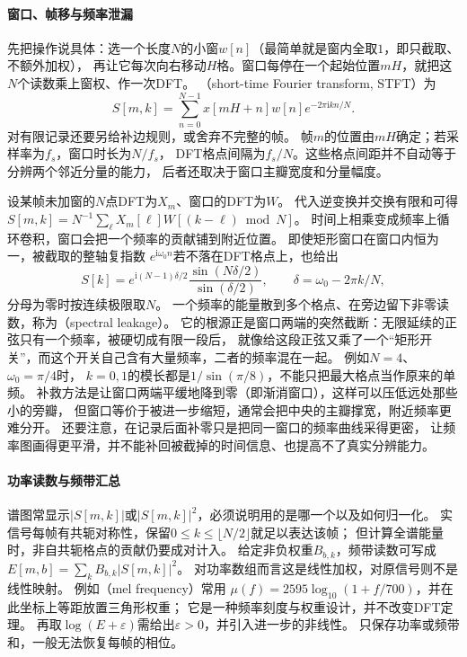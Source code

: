 \paragraph{窗口、帧移与频率泄漏}
先把操作说具体：选一个长度$N$的小窗$w[n]$（最简单就是窗内全取$1$，即只截取、不额外加权），
再让它每次向右移动$H$格。窗口每停在一个起始位置$mH$，就把这$N$个读数乘上窗权、作一次DFT。
（short-time Fourier transform, STFT）为
\begin{equation}
 S[m,k]=\sum_{n=0}^{N-1}x[mH+n]w[n]e^{-2\pi\mathrm i kn/N}.
 \label{eq:signal-stft}
\end{equation}
对有限记录还要另给补边规则，或舍弃不完整的帧。
帧$m$的位置由$mH$确定；若采样率为$f_s$，窗口时长为$N/f_s$，
DFT格点间隔为$f_s/N$。这些格点间距并不自动等于分辨两个邻近分量的能力，
后者还取决于窗口主瓣宽度和分量幅度。

设某帧未加窗的$N$点DFT为$X_m$、窗口的DFT为$W$。
代入逆变换并交换有限和可得
$S[m,k]=N^{-1}\sum_\ell X_m[\ell]W[(k-\ell)\bmod N]$。
时间上相乘变成频率上循环卷积，窗口会把一个频率的贡献铺到附近位置。
即使矩形窗口在窗口内恒为一，被截取的整轴复指数
$e^{\mathrm i\omega_0 n}$若不落在DFT格点上，也给出
\[
 S[k]=e^{\mathrm i(N-1)\delta/2}
 \frac{\sin(N\delta/2)}{\sin(\delta/2)},\qquad
 \delta=\omega_0-2\pi k/N,
\]
分母为零时按连续极限取$N$。
一个频率的能量散到多个格点、在旁边留下非零读数，称为（spectral leakage）。
它的根源正是窗口两端的突然截断：无限延续的正弦只有一个频率，被硬切成有限一段后，
就像给这段正弦又乘了一个“矩形开关”，而这个开关自己含有大量频率，二者的频率混在一起。
例如$N=4$、$\omega_0=\pi/4$时，
$k=0,1$的模长都是$1/\sin(\pi/8)$，不能只把最大格点当作原来的单频。
补救方法是让窗口两端平缓地降到零（即渐消窗口），这样可以压低远处那些小的旁瓣，
但窗口等价于被进一步缩短，通常会把中央的主瓣撑宽，附近频率更难分开。
还要注意，在记录后面补零只是把同一窗口的频率曲线采得更密，
让频率图画得更平滑，并不能补回被截掉的时间信息、也提高不了真实分辨能力。

\paragraph{功率读数与频带汇总}
谱图常显示$|S[m,k]|$或$|S[m,k]|^2$，必须说明用的是哪一个以及如何归一化。
实信号每帧有共轭对称性，保留$0\leq k\leq\lfloor N/2\rfloor$就足以表达该帧；
但计算全谱能量时，非自共轭格点的贡献仍要成对计入。
给定非负权重$B_{b,k}$，频带读数可写成
$E[m,b]=\sum_k B_{b,k}|S[m,k]|^2$。
对功率数组而言这是线性加权，对原信号则不是线性映射。
例如（mel frequency）常用
$\mu(f)=2595\log_{10}(1+f/700)$，并在此坐标上等距放置三角形权重；
它是一种频率刻度与权重设计，并不改变DFT定理。
再取$\log(E+\varepsilon)$需给出$\varepsilon>0$，并引入进一步的非线性。
只保存功率或频带和，一般无法恢复每帧的相位。

